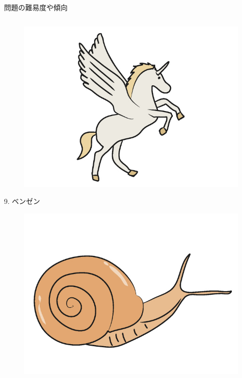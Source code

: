 \documentclass[dvipdfmx]{beamer}
\newenvironment{wideitemize}{\itemize\setlength{\itemsep}{1em}}{\enditemize}
\begin{document}
\begin{frame}{問題の難易度や傾向}
\begin{columns}[t]
\begin{column}{0.5\textwidth}
\begin{wideitemize}
\begin{figure}[htbp]
    \includegraphics[bb=0 0 6.4 4.8, scale=0.09]{img/a08_2.jpg}
\end{figure}
\item[9.] ベンゼン
\begin{figure}[htbp]
    \centering
    \includegraphics[bb=-300 0 6.4 4.8, scale=0.055]{img/a09.jpg}
\end{figure}
\end{wideitemize}
\end{column}
\end{columns}
\end{frame}

\end{document}
